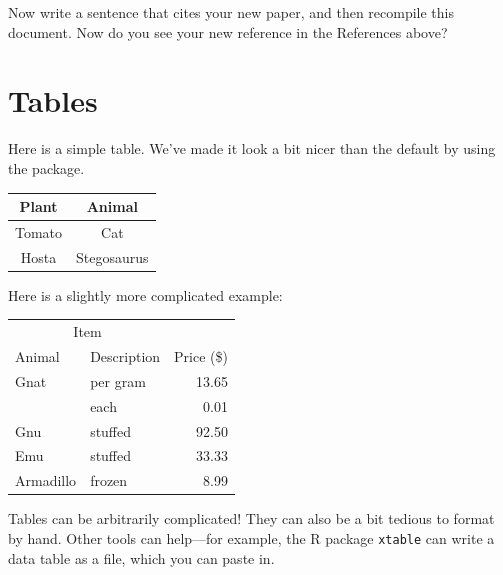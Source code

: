 \documentclass{article}
\begin{document}
Now write a sentence that cites your new paper, and then recompile this document.
Now do you see your new reference in the References above?

\section{Tables}
\label{sec:tables}

Here is a simple table.
We've made it look a bit nicer than the default by using the  package.

\begin{tabular}{cc}
\toprule
Plant  & Animal      \\
\midrule
Tomato & Cat         \\
Hosta  & Stegosaurus \\
\bottomrule
\end{tabular}

Here is a slightly more complicated example:

\begin{center}
\begin{tabular}{llr}  
  \toprule
  \multicolumn{2}{c}{Item} \\
  \cmidrule(r){1-2}
  Animal    & Description & Price (\$) \\
  \midrule
  Gnat      & per gram    & 13.65      \\
            &    each     & 0.01       \\
  Gnu       & stuffed     & 92.50      \\
  Emu       & stuffed     & 33.33      \\
  Armadillo & frozen      & 8.99       \\
  \bottomrule
\end{tabular}
\end{center}

Tables can be arbitrarily complicated!
They can also be a bit tedious to format by hand.
Other tools can help---for example, the R package \texttt{xtable} can write a data table as a  file, which you can paste in.

\subsection*{\task}
\end{document}
